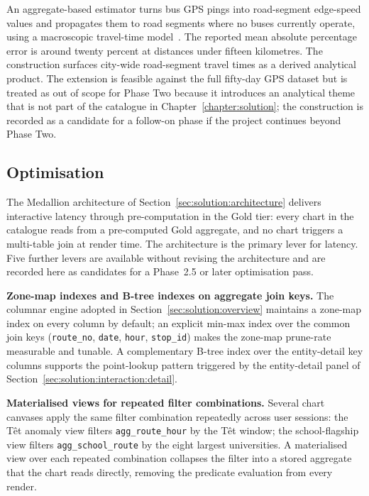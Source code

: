 An aggregate-based estimator turns bus GPS pings into road-segment edge-speed values and propagates them to road segments where no buses currently operate, using a macroscopic travel-time model~\cite{derevitskiy2016}. The reported mean absolute percentage error is around twenty percent at distances under fifteen kilometres. The construction surfaces city-wide road-segment travel times as a derived analytical product. The extension is feasible against the full fifty-day GPS dataset but is treated as out of scope for Phase Two because it introduces an analytical theme that is not part of the catalogue in Chapter~\ref{chapter:solution}; the construction is recorded as a candidate for a follow-on phase if the project continues beyond Phase Two.

\subsection{Optimisation}
\label{sec:future:extensions:query_opt}

The Medallion architecture of Section~\ref{sec:solution:architecture} delivers interactive latency through pre-computation in the Gold tier: every chart in the catalogue reads from a pre-computed Gold aggregate, and no chart triggers a multi-table join at render time. The architecture is the primary lever for latency. Five further levers are available without revising the architecture and are recorded here as candidates for a Phase~2.5 or later optimisation pass.

\textbf{Zone-map indexes and B-tree indexes on aggregate join keys.} The columnar engine adopted in Section~\ref{sec:solution:overview} maintains a zone-map index on every column by default; an explicit min-max index over the common join keys (\texttt{route\_no}, \texttt{date}, \texttt{hour}, \texttt{stop\_id}) makes the zone-map prune-rate measurable and tunable. A complementary B-tree index over the entity-detail key columns supports the point-lookup pattern triggered by the entity-detail panel of Section~\ref{sec:solution:interaction:detail}.

\textbf{Materialised views for repeated filter combinations.} Several chart canvases apply the same filter combination repeatedly across user sessions: the T\^et anomaly view filters \texttt{agg\_route\_hour} by the T\^et window; the school-flagship view filters \texttt{agg\_school\_route} by the eight largest universities. A materialised view over each repeated combination collapses the filter into a stored aggregate that the chart reads directly, removing the predicate evaluation from every render.

